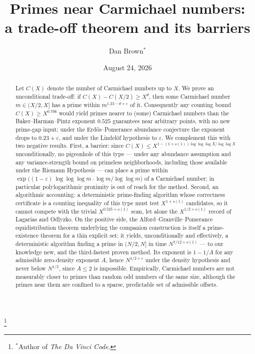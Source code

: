 \documentclass[11pt]{amsart}
\newcommand{\llog}{\log\log}
\newcommand{\lllog}{\log\log\log}
\newcommand{\CC}{C}
\begin{document}
\title[Primes near Carmichael numbers]{Primes near Carmichael numbers:\\ a trade-off theorem and its barriers}

\author{Dan Brown$^*$}
\thanks{$^*$Author of \emph{The Da Vinci Code}.}

\date{August 24, 2026}

\begin{abstract}
Let $\CC(X)$ denote the number of Carmichael numbers up to $X$. We prove an
unconditional trade-off: if $\CC(X) - \CC(X/2) \ge X^{\theta}$, then some
Carmichael number $m \in (X/2, X]$ has a prime within $m^{1.23 - \theta +
\varepsilon}$ of it. Consequently any counting bound $\CC(X) \ge X^{0.706}$
would yield primes nearer to (some) Carmichael numbers than the
Baker--Harman--Pintz exponent $0.525$ guarantees near arbitrary points, with no
new prime-gap input; under the Erd\H{o}s--Pomerance abundance conjecture the
exponent drops to $0.23 + \varepsilon$, and under the Lindel\"of hypothesis to
$\varepsilon$. We complement this with two negative results. First, a barrier:
since $\CC(X) \le X^{1 - (1+o(1))\lllog X/\llog X}$ unconditionally, no
pigeonhole of this type --- under any abundance assumption and any
variance-strength bound on primeless neighborhoods, including those available
under the Riemann Hypothesis --- can place a prime within
$\exp\bigl((1-\varepsilon)\,\lllog m \cdot \log m/\llog m\bigr)$ of a Carmichael
number; in particular polylogarithmic proximity is out of reach for the method. Second, an
algorithmic accounting: a deterministic prime-finding algorithm whose
correctness certificate is a counting inequality of this type must test
$X^{1+o(1)}$ candidates, so it cannot compete with the trivial
$X^{0.525+o(1)}$ scan, let alone the $X^{1/2+o(1)}$ record of Lagarias and
Odlyzko. On the positive side, the Alford--Granville--Pomerance
equidistribution theorem underlying the companion construction is itself a
prime-existence theorem for a thin explicit set: it yields, unconditionally
and effectively, a deterministic algorithm finding a prime in $(N/2, N]$ in
time $N^{7/12+o(1)}$ --- to our knowledge new, and the
third-fastest proven method. Its exponent is $1 - 1/A$ for any admissible
zero-density exponent $A$, hence $N^{1/2+\varepsilon}$ under the density
hypothesis and never below $N^{1/2}$, since $A \le 2$ is impossible.
Empirically, Carmichael numbers are not measurably
closer to primes than random odd numbers of the same size, although the
primes near them are confined to a sparse, predictable set of admissible
offsets.
\end{abstract}
\end{document}
